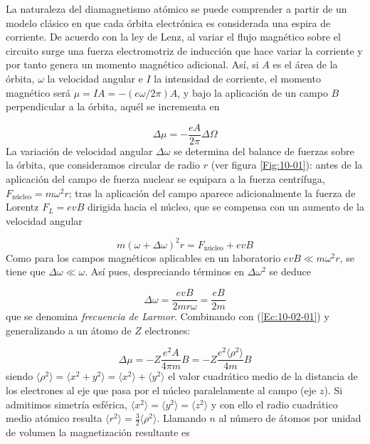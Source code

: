 La naturaleza del diamagnetismo atómico se puede comprender a partir de un modelo clásico en que cada órbita electrónica es considerada una espira de corriente. De acuerdo con la ley de Lenz, al variar el flujo magnético sobre el circuito surge una fuerza electromotriz de inducción que hace variar la corriente y por tanto genera un momento magnético adicional. Así, si $A$ es el área de la órbita, $\omega$ la velocidad angular e $I$ la intensidad de corriente, el momento magnético será $\mu=IA=-(e\omega / 2\pi)A$, y bajo la aplicación de un campo $B$ perpendicular a la órbita, aquél se incrementa en

\begin{equation}
	\Delta \mu = - \frac{eA}{2\pi} \Delta \Omega \label{Ec:10-02-01}
\end{equation}
La variación de velocidad angular $\Delta \omega$ se determina del balance de fuerzas sobre la órbita, que consideramos circular de radio $r$ (ver figura \ref{Fig:10-01}): antes de la aplicación del campo de fuerza nuclear se equipara a la fuerza centrífuga, $F_\text{núcleo} = m\omega^2 r$; tras la aplicación del campo aparece adicionalmente la fuerza de Lorentz $F_L = ev B$ dirigida hacia el núcleo, que se compensa con un aumento de la velocidad angular 

\begin{equation}
	m(\omega + \Delta \omega)^2 r = F_\text{núcleo} + e v B
\end{equation}
Como para los campos magnéticos aplicables en un laboratorio $evB\ll m \omega^2 r$, se tiene que $\Delta \omega \ll \omega$. Así pues, despreciando términos en $\Delta \omega^2$ se deduce 

\begin{equation}
	\Delta \omega = \frac{evB}{2mr\omega} = \frac{eB}{2m}
\end{equation}
que se denomina \textit{frecuencia de Larmor}. Combinando con (\ref{Ec:10-02-01}) y generalizando a un átomo de $Z$ electrones:

\begin{equation}
	\Delta \mu = - Z \frac{e^2A}{4\pi m} B = - Z \frac{e^2 \langle \rho^2 \rangle}{4m}B
\end{equation}
siendo $\langle \rho^2 \rangle = \langle x^2 + y^2 \rangle = \langle x^2 \rangle + \langle y^2 \rangle$ el valor cuadrático medio de la distancia de los electrones al eje que pasa por el núcleo paralelamente al campo (eje $z$). Si admitimos simetría esférica, $\langle x^2 \rangle=\langle y^2 \rangle=\langle z^2 \rangle$ y con ello el radio cuadrático medio atómico resulta $\langle r^2 \rangle = \frac{3}{2} \langle \rho^2 \rangle$. Llamando $n$ al número de átomos por unidad de volumen la magnetización resultante es

